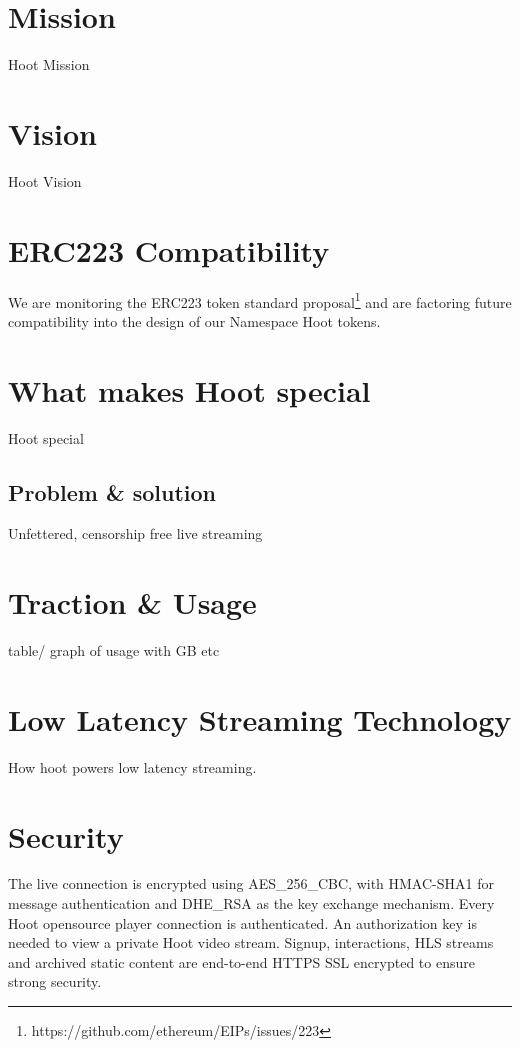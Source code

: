 \documentclass{article}
\begin{document}
\section{Mission}
Hoot Mission

\section{Vision}
Hoot Vision

\section{ERC223 Compatibility}
We are monitoring the ERC223 token standard proposal\footnote{https://github.com/ethereum/EIPs/issues/223} and are factoring future compatibility into the design of our Namespace Hoot tokens.

\section{What makes Hoot special}
Hoot special

\subsection{Problem \& solution}
Unfettered, censorship free live streaming

\section{Traction \& Usage}
table/ graph of usage with GB etc

\section{Low Latency Streaming Technology}
How hoot powers low latency streaming.



\section{Security}
The live connection is encrypted using AES\_256\_CBC, with HMAC-SHA1 for message authentication and DHE\_RSA as the key exchange mechanism. Every Hoot opensource player connection is authenticated.
An authorization key is needed to view a private Hoot video stream. Signup, interactions, HLS streams and archived static content are end-to-end HTTPS  SSL encrypted to ensure strong security.    
\end{document}
